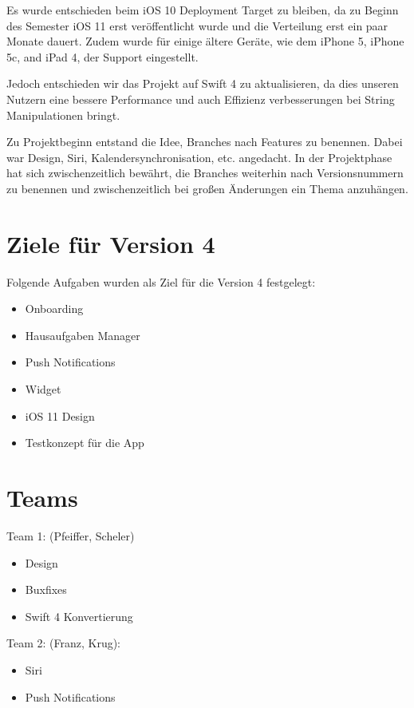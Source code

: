 Es wurde entschieden beim iOS 10 Deployment Target zu bleiben, da zu Beginn des Semester iOS 11 erst veröffentlicht wurde und die Verteilung erst ein paar Monate dauert. Zudem wurde für einige ältere Geräte, wie dem iPhone 5, iPhone 5c, and iPad 4, der Support eingestellt.

Jedoch entschieden wir das Projekt auf Swift 4 zu aktualisieren, da dies unseren Nutzern eine bessere Performance und auch Effizienz verbesserungen bei String Manipulationen bringt.

Zu Projektbeginn entstand die Idee, Branches nach Features zu benennen. Dabei war Design, Siri, Kalendersynchronisation, etc. angedacht. In der Projektphase hat sich zwischenzeitlich bewährt, die Branches weiterhin nach Versionsnummern zu benennen und zwischenzeitlich bei großen Änderungen ein Thema anzuhängen.


\section{Ziele für Version 4}
Folgende Aufgaben wurden als Ziel für die Version 4 festgelegt:
\begin{itemize}
\item Onboarding
\item Hausaufgaben Manager
\item Push Notifications
\item Widget
\item iOS 11 Design
\item Testkonzept für die App
\end{itemize}


\section{Teams}

Team 1: (Pfeiffer, Scheler)
\begin{itemize}
\item Design
\item Buxfixes
\item Swift 4 Konvertierung
\end{itemize}


Team 2: (Franz, Krug):
\begin{itemize}
\item Siri
\item Push Notifications
\end{itemize}


